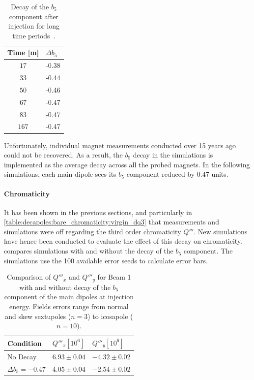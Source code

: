 \begin{table}[!htb]
    \centering
    \begin{tabular}{cl}
        \toprule
        Time [m] & $\Delta b_5$ \\
        \midrule
        $17$    & -0.38 \\ 
        $33$    & -0.44 \\
        $50$    & -0.46 \\
        $67$    & -0.47 \\
        $83$    & -0.47 \\
        $167$   & -0.47 \\
        \bottomrule
    \end{tabular}
    \caption{Decay of the $b_5$ component after injection for long time
    periods~\cite{deniau_magnetic_2009}.}
    \label{table:decapoles:decay:decay_b5}
\end{table}
 
Unfortunately, individual magnet measurements conducted over 15 years ago could not be recovered. As
a result, the $b_5$ decay in the simulations is implemented as the average decay across all the
probed magnets. In the following simulations, each main dipole sees its $b_5$ component reduced by
$0.47$ units.


\paragraph{Chromaticity}

It has been shown in the previous sections, and particularly in
\cref{table:decapoles:bare_chromaticity:virgin_dq3} that measurements and simulations were off
regarding the third order chromaticity $Q'''$.
New simulations have hence been conducted to evaluate the effect of this decay on chromaticity.
 compares simulations with and
without the decay of the $b_5$ component. The simulations use the 100 available error seeds to
calculate error bars.

\begin{table}[!htb]
    \centering
    \begin{tabular}{lll}
      \toprule
      Condition            & $Q'''_x [10^6]$ & $Q'''_y [10^6]$ \\
      \midrule
      No Decay             & $6.93 \pm 0.04$ & $-4.32 \pm 0.02$ \\
      $\Delta b_5 = -0.47$ & $4.05 \pm 0.04$ & $-2.54 \pm 0.02 $ \\
      \bottomrule
    \end{tabular}
    \caption{Comparison of $Q'''_x$ and $Q'''_y$ for Beam 1 with and without decay of the $b_5$
    component of the main dipoles at injection energy. Fields errors range from normal and skew
    sextupoles ($n=3$) to icosapole ($n=10$).}
    \label{table:decapoles:decay:simulation_chromaticity}
  \end{table}

